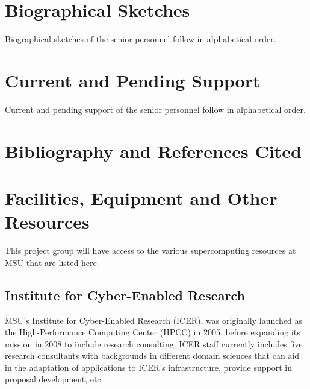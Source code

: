 \documentclass[10pt]{article}
\begin{document}
\section{Biographical Sketches}

Biographical sketches of the senior personnel follow in alphabetical order.


\clearpage
\section{Current and Pending Support}

Current and pending support of the senior personnel follow in alphabetical order.


\clearpage

\section{Bibliography and References Cited}











\section{Facilities, Equipment and Other Resources}

This project group will have access to the various supercomputing resources at MSU that are listed here.
\subsection{Institute for Cyber-Enabled Research}

MSU's Institute for Cyber-Enabled Research (ICER), was originally launched as
the High-Performance Computing Center (HPCC) in 2005, before expanding
its mission in 2008 to include research consulting. ICER staff currently
includes five research consultants with backgrounds in different domain
sciences that can aid in the adaptation of applications to ICER's
infrastructure, provide support in proposal development, etc.
\end{document}
